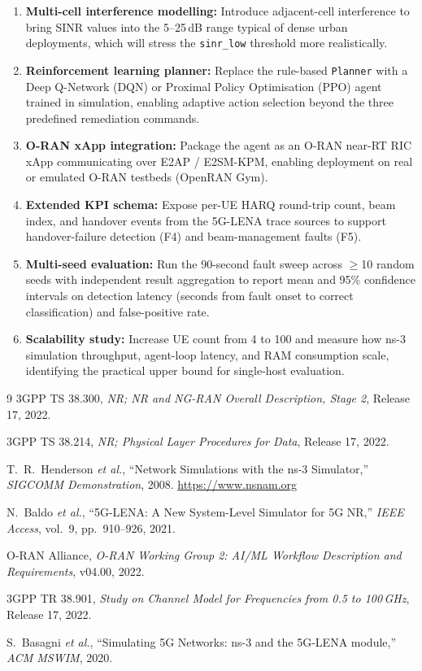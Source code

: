\documentclass[12pt,a4paper]{article}
\begin{document}
\begin{enumerate}[noitemsep]
  \item \textbf{Multi-cell interference modelling:} Introduce adjacent-cell
    interference to bring SINR values into the 5--25\,dB range typical of
    dense urban deployments, which will stress the \texttt{sinr\_low} threshold
    more realistically.
  \item \textbf{Reinforcement learning planner:} Replace the rule-based
    \texttt{Planner} with a Deep Q-Network (DQN) or Proximal Policy
    Optimisation (PPO) agent trained in simulation, enabling adaptive
    action selection beyond the three predefined remediation commands.
  \item \textbf{O-RAN xApp integration:} Package the agent as an O-RAN
    near-RT RIC xApp communicating over E2AP / E2SM-KPM, enabling
    deployment on real or emulated O-RAN testbeds (OpenRAN Gym).
  \item \textbf{Extended KPI schema:} Expose per-UE HARQ round-trip count,
    beam index, and handover events from the 5G-LENA trace sources to
    support handover-failure detection (F4) and beam-management faults (F5).
  \item \textbf{Multi-seed evaluation:} Run the 90-second fault sweep across
    $\geq$10 random seeds with independent result aggregation to report
    mean and 95\% confidence intervals on detection latency (seconds from
    fault onset to correct classification) and false-positive rate.
  \item \textbf{Scalability study:} Increase UE count from 4 to 100 and
    measure how ns-3 simulation throughput, agent-loop latency, and RAM
    consumption scale, identifying the practical upper bound for
    single-host evaluation.
\end{enumerate}

\begin{thebibliography}{9}
3GPP TS 38.300, \emph{NR; NR and NG-RAN Overall Description, Stage 2},
Release 17, 2022.

3GPP TS 38.214, \emph{NR; Physical Layer Procedures for Data},
Release 17, 2022.

T.\ R.\ Henderson \emph{et al.}, ``Network Simulations with the ns-3 Simulator,''
\emph{SIGCOMM Demonstration}, 2008. \url{https://www.nsnam.org}

N.\ Baldo \emph{et al.}, ``5G-LENA: A New System-Level Simulator for 5G NR,''
\emph{IEEE Access}, vol.\ 9, pp.\ 910--926, 2021.

O-RAN Alliance, \emph{O-RAN Working Group 2: AI/ML Workflow Description and
Requirements}, v04.00, 2022.

3GPP TR 38.901, \emph{Study on Channel Model for Frequencies from 0.5 to
100\,GHz}, Release 17, 2022.

S.\ Basagni \emph{et al.}, ``Simulating 5G Networks: ns-3 and the 5G-LENA
module,'' \emph{ACM MSWIM}, 2020.
\end{thebibliography}
\end{document}
